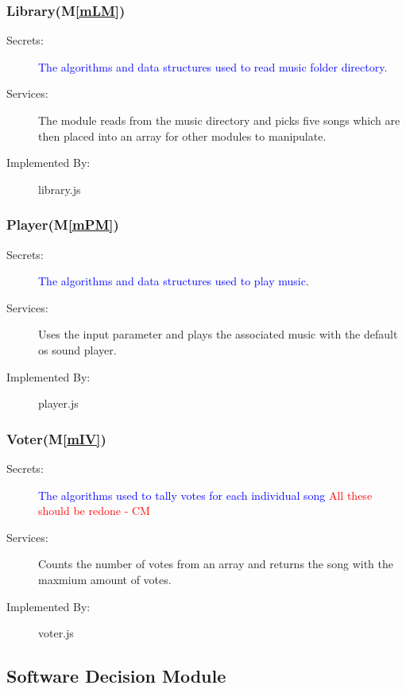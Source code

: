 \documentclass[12pt, titlepage]{article}
\newcommand{\mref}[1]{M\ref{#1}}
\begin{document}
\subsubsection{Library(\mref{mLM})} 
\begin{description} 
\item[Secrets:] \textcolor{blue}{The algorithms and data structures used to read music folder directory}. \item[Services:]The module reads from the music directory and picks five songs which are then placed into an array for other modules to manipulate. \item[Implemented By:] library.js 
\end{description} 

\subsubsection{Player(\mref{mPM})}


\begin{description}
\item[Secrets:] \textcolor{blue}{The algorithms and data structures used to play music}.
\item[Services:]Uses the input parameter and plays the associated music with the default os sound player.
\item[Implemented By:]player.js
\end{description}



\subsubsection{Voter(\mref{mIV})}


\begin{description}
\item[Secrets:]\textcolor{blue}{The algorithms used to tally votes for each individual song} \textcolor{red}{All these should be redone - CM} \\
\item[Services:]Counts the number of votes from an array and returns the song with the maxmium amount of votes.
\item[Implemented By:] voter.js
\end{description}










\subsection{Software Decision Module}
\end{document}
